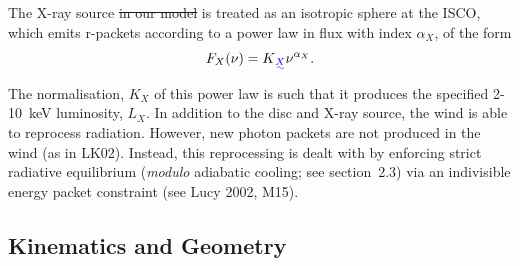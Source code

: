 \documentclass[preprint, a4paper, 11pt]{aastex}
\providecommand{\DIFadd}[1]{{\protect\color{blue}\uwave{#1}}} %
\providecommand{\DIFdel}[1]{{\protect\color{red}\sout{#1}}}                      %
\providecommand{\DIFaddbegin}{} %
\providecommand{\DIFaddend}{} %
\providecommand{\DIFdelbegin}{} %
\providecommand{\DIFdelend}{} %
\begin{document}
The X-ray source \DIFdelbegin \DIFdel{in our model }\DIFdelend is treated as an isotropic sphere at the ISCO,
which emits r-packets according to a power law in flux with index $\alpha_X$, of the form
\begin{equation}
F_X (\nu) = K\DIFaddbegin \DIFadd{_X }\DIFaddend \nu^{\alpha_X}.
\end{equation}
The normalisation, $K_X$ of this power law is such that it 
produces the specified 2-10~keV luminosity, $L_X$.
In addition to the disc and X-ray source, 
the wind is able to reprocess radiation. However, new 
photon packets are not produced in the wind (as in LK02). 
Instead, this reprocessing is dealt with by enforcing strict
radiative equilibrium ({\em modulo} adiabatic cooling; see section~2.3)
via an indivisible energy packet
constraint (see Lucy 2002, M15).

\DIFdelbegin %




\DIFdelend \subsection{Kinematics and Geometry}
\end{document}
